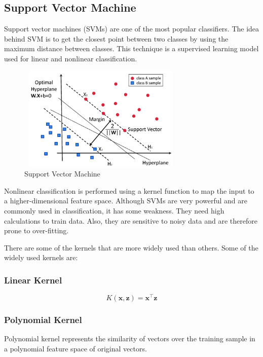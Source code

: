 \documentclass[final]{cvpr}
\begin{document}
\subsection{Support Vector Machine}

Support vector machines (SVMs) are one of the most popular classifiers. The idea behind SVM is to get the closest point between two classes by using the maximum distance between
classes. This technique is a supervised learning model used for linear and nonlinear classification. 

\hspace*{-0.2in}
\begin{figure}[h]
   \centering
   \includegraphics[width=8cm, height=5cm]{images/Support-Vector-Machine.png}
   \caption{Support Vector Machine}
   \label{fig:Support-Vector-Machine}
\end{figure}

Nonlinear classification is performed using a kernel function to map the input to a higher-dimensional feature space. Although SVMs are very powerful and are commonly used in classification, it has some
weakness. They need high calculations to train data. Also, they are sensitive to noisy data and are therefore prone to over-fitting. 


There are some of the kernels that are more widely used than others. Some of the widely used kernels are:

\subsubsection{Linear Kernel}

$$K(\mathbf{x}, \mathbf{z}) = \mathbf{x}^\intercal \mathbf{z}$$

\subsubsection{Polynomial Kernel}

    Polynomial kernel represents the similarity of vectors over the training sample in a polynomial feature space of original vectors. 
\end{document}
